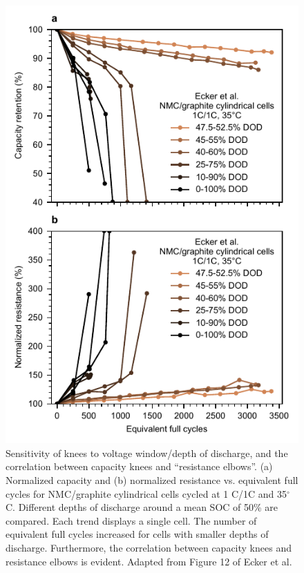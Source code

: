 \documentclass[journal=jpclcd,manuscript=article]{achemso}
\begin{document}
\begin{figure}[ht!]
\centering
\includegraphics[scale=1.0]{final_figures/ecker_remade.pdf}
\caption{Sensitivity of knees to voltage window/depth of discharge, and the correlation between capacity knees and ``resistance elbows''.
(a) Normalized capacity and (b) normalized resistance vs. equivalent full cycles for NMC/graphite cylindrical cells cycled at 1 C/1C and 35$^{\circ}$C.
Different depths of discharge around a mean SOC of 50\% are compared. Each trend displays a single cell. The number of equivalent full cycles increased for cells with smaller depths of discharge. Furthermore, the correlation between capacity knees and resistance elbows is evident.
Adapted from Figure 12 of Ecker et al.\cite{ecker_calendar_2014}
}
\label{fig:ecker_capacity_and_resistance}
\end{figure}
\end{document}
